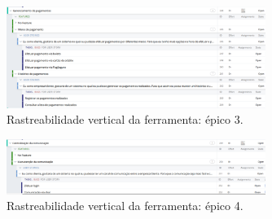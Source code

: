 \begin{figure}[!htbp]
\centering
\includegraphics[width=0.75\textwidth]{figuras/targetprocess_ep3}
\caption{Rastreabilidade vertical da ferramenta: épico 3.}
\label{targetprocess_ep3}
\end{figure}

\begin{figure}[!htbp]
\centering
\includegraphics[width=0.75\textwidth]{figuras/targetprocess_ep4}
\caption{Rastreabilidade vertical da ferramenta: épico 4.}
\label{targetprocess_ep4}
\end{figure}

